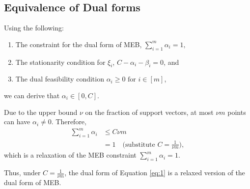 \documentclass{article}
\begin{document}
\subsection{Equivalence of Dual forms}
Using the following:
\begin{enumerate}
\item The constraint for the dual form of MEB, $\sum_{i=1}^{m} \alpha_i = 1,$
\item The stationarity condition for \( \xi_i \), \( C - \alpha_i - \beta_i = 0 \), and
\item The dual feasibility condition $\alpha_i \geq 0 \text{ for } i \in [m]$,
\end{enumerate}
we can derive that \( \alpha_i \in [0, C] \).

Due to the upper bound \( \nu \) on the fraction of support vectors, at most \( \nu m \) points can have \( \alpha_i \neq 0 \).
Therefore,
\begin{align*}
\sum_{i=1}^{m} \alpha_i &\leq C \nu m\\
&= 1 \quad \text{(substitute $C = \frac{1}{\nu m}$)},
\end{align*}
which is a relaxation of the MEB constraint \( \sum_{i=1}^{m} \alpha_i = 1 \).

Thus, under \( C = \frac{1}{\nu m} \), the dual form of Equation \ref{eq:1} is a relaxed version of the dual form of MEB.
\end{document}
